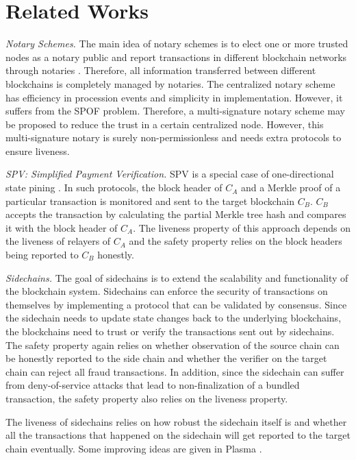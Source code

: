 \section{Related Works}
\label{chp:related-work}
\noindent
\emph{Notary Schemes.} The main idea of notary schemes is to elect one or more trusted nodes as a notary public and report transactions in different blockchain networks through notaries \cite{qin2018overview}. Therefore, all information transferred between different blockchains is completely managed by notaries. The centralized notary scheme has efficiency in procession events and simplicity in implementation. However, it suffers from the SPOF problem. Therefore, a multi-signature notary scheme may be proposed to reduce the trust in a certain centralized node. However, this multi-signature notary is surely non-permissionless and needs extra protocols to ensure liveness.

\smallskip\noindent\emph{SPV: Simplified Payment Verification.}
SPV \cite{lin2017survey,ray2020blwn} is a special case of one-directional state pining \cite{robinson2020merits}. In such protocols, the block header of $C_A$ and a Merkle proof of a particular transaction is monitored and sent to the target blockchain $C_B$. $C_B$ accepts the transaction by calculating the partial Merkle tree hash and compares it with the block header of $C_A$. The liveness property of this approach depends on the liveness of relayers of $C_A$ and the safety property relies on the block headers being reported to $C_B$ honestly. 
    
\smallskip\noindent\emph{Sidechains.}
The goal of sidechains \cite{singh2020sidechain} is to extend the scalability and functionality of the blockchain system. Sidechains can enforce the security of transactions on themselves by implementing a protocol that can be validated by consensus. Since the sidechain needs to update state changes back to the underlying blockchains, the blockchains need to trust or verify the transactions sent out by sidechains. The safety property again relies on whether observation of the source chain can be honestly reported to the side chain and whether the verifier on the target chain can reject all fraud transactions. In addition, since the sidechain can suffer from deny-of-service attacks that lead to non-finalization of a bundled transaction, the safety property also relies on the liveness property.

The liveness of sidechains relies on how robust the sidechain itself is and whether all the transactions that happened on the sidechain will get reported to the target chain eventually. Some improving ideas are given in Plasma \cite{poon2017plasma}.

